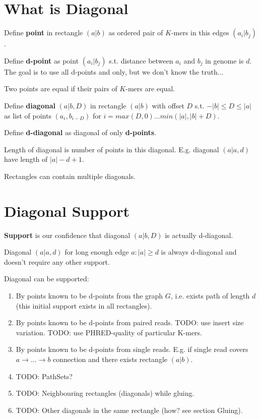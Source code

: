 \documentclass[a4paper]{article}
\begin{document}
\section{What is Diagonal}

Define \textbf{point} in rectangle $(a|b)$ as ordered pair of $K$-mers in this edges $(a_i|b_j)$.

Define \textbf{d-point} as point $(a_i|b_j)$ s.t. distance between $a_i$ and $b_j$ in genome is $d$. The goal is to use all d-points and only, but we don't know the truth...

Two points are equal if their pairs of $K$-mers are equal.

Define \textbf{diagonal} $(a|b, D)$ in rectangle $(a|b)$ with offset $D$ s.t. $-|b| \leq D \leq |a|$ as list of points $(a_i, b_{i-D})$ for $i = max(D, 0) ... min(|a|, |b|+D)$.

Define \textbf{d-diagonal} as diagonal of only \textbf{d-points}. 

Length of diagonal is number of points in this diagonal. E.g. diagonal $(a|a, d)$ have length of $|a| - d + 1$.

Rectangles can contain multiple diagonals.

\section{Diagonal Support}

\textbf{Support} is our confidence that diagonal $(a|b, D)$ is actually d-diagonal.

Diagonal $(a|a, d)$ for long enough edge $a: |a| \geq d$ is always d-diagonal and doesn't require any other support.

Diagonal can be supported:
\begin{enumerate}
\item By points known to be d-points from the graph $G$, i.e. exists path of length $d$ (this initial support exists in all rectangles).
\item By points known to be d-points from paired reads. TODO: use insert size variation. TODO: use PHRED-quality of particular K-mers.
\item By points known to be d-points from single reads. E.g. if single read covers $a \rightarrow ... \rightarrow b$ connection and there exists rectangle $(a|b)$.
\item TODO: PathSets?
\item TODO: Neighbouring rectangles (diagonals) while gluing.
\item TODO: Other diagonals in the same rectangle (how? see section Gluing).
\end{enumerate}
\end{document}
